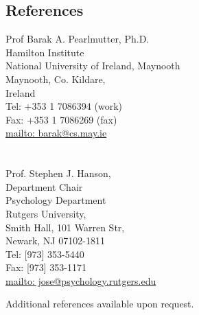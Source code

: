 \documentclass[10pt,overlapped,line]{res}
\begin{document}
\begin{resume}
 \section{References}
  \begin{multicols}{2}
 {\small
    Prof Barak A. Pearlmutter, Ph.D. \\
    Hamilton Institute \\
    National University of Ireland, Maynooth \\
    Maynooth, Co. Kildare, \\
    Ireland \\
    Tel: +353 1 7086394 (work) \\
    Fax: +353 1 7086269 (fax) \\
    \href{URL}{mailto: barak@cs.may.ie} \\
\\
\\
    Prof. Stephen J. Hanson, \\
    Department Chair \\
    Psychology Department \\
    Rutgers University, \\
    Smith Hall, 101 Warren Str, \\
    Newark, NJ 07102-1811 \\
    Tel: [973] 353-5440 \\
    Fax: [973] 353-1171 \\
    \href{URL}{mailto: jose@psychology.rutgers.edu} \\
 }
 \end{multicols}

Additional references available upon request.



\end{resume}
\end{document}
